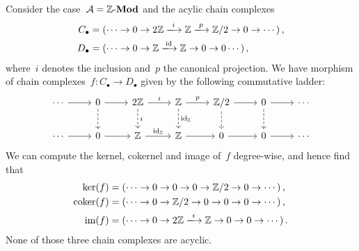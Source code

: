 Consider the case~$\mathcal{A} = \text{$\mathbb{Z}$-$\mathbf{Mod}$}$ and the acylic chain complexes
\begin{align*}
      C_\bullet
  &=  (
        \dotsb
        \to
        0
        \to
        2 \Integer
        \xlongto{i}
        \Integer
        \xlongto{p}
        \Integer/2
        \to
        0
        \to
        \dotsb
      ) \,,
  \\
      D_\bullet
  &=  (
        \dotsb
        \to
        0
        \to
        \Integer
        \xlongto{\id}
        \Integer
        \to
        0
        \to
        0
        \dotsb
      ) \,,
\end{align*}
where~$i$ denotes the inclusion and~$p$ the canonical projection.
We have morphism of chain complexes~$f \colon C_\bullet \to D_\bullet$ given by the following commutative ladder:
\[
  \begin{tikzcd}
      \dotsb
      \arrow{r}
    & 0
      \arrow{r}
      \arrow[dashed]{d}
    & 2\Integer
      \arrow{r}[above]{i}
      \arrow[dashed]{d}[right]{i}
    & \Integer
      \arrow{r}[above]{p}
      \arrow[dashed]{d}{\id_\Integer}
    & \Integer/2
      \arrow{r}
      \arrow[dashed]{d}
    & 0
      \arrow{r}
      \arrow[dashed]{d}
    & \dotsb
    \\
      \dotsb
      \arrow{r}
    & 0
      \arrow{r}
    & \Integer
      \arrow{r}[above]{\id_\Integer}
    & \Integer
      \arrow{r}
    & 0
      \arrow{r}
    & 0
      \arrow{r}
    & \dotsb
  \end{tikzcd}
\]
We can compute the kernel, cokernel and image of~$f$ degree-wise, and hence find that
\begin{align*}
      \ker(f)
  &=  (
        \dotsb
        \to
        0
        \to
        0
        \to
        0
        \to
        \Integer/2
        \to
        0
        \to
        \dotsb
      ) \,,
  \\
      \coker(f)
  &=  (
        \dotsb
        \to
        0
        \to
        \Integer/2
        \to
        0
        \to
        0
        \to
        0
        \to
        \dotsb
      ) \,,
  \\
      \im(f)
  &=  (
        \dotsb
        \to
        0
        \to
        2\Integer
        \xlongto{i}
        \Integer
        \to
        0
        \to
        0
        \to
        \dotsb
      ) \,.
\end{align*}
None of those three chain complexes are acyclic.




